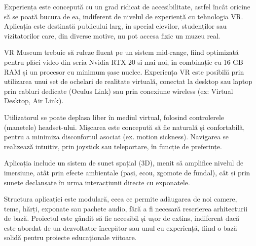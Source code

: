 Experiența este concepută cu un grad ridicat de accesibilitate, astfel încât oricine să se poată bucura de ea, indiferent de nivelul de experiență cu tehnologia VR. Aplicația este destinată publicului larg, în special elevilor, studenților sau vizitatorilor care, din diverse motive, nu pot accesa fizic un muzeu real.

VR Museum trebuie să ruleze fluent pe un sistem mid-range, fiind optimizată pentru plăci video din seria Nvidia RTX 20 si mai noi, în combinație cu 16 GB RAM și un procesor cu minimum șase nuclee. Experiența VR este posibilă prin utilizarea unui set de ochelari de realitate virtuală, conectat la desktop sau laptop prin cabluri dedicate (Oculus Link) sau prin conexiune wireless (ex: Virtual Desktop, Air Link).

Utilizatorul se poate deplasa liber în mediul virtual, folosind controlerele (manetele) headset-ului. Mișcarea este concepută să fie naturală și confortabilă, pentru a minimiza disconfortul asociat (ex. motion sickness). Navigarea se realizează intuitiv, prin joystick sau teleportare, în funcție de preferințe.

Aplicația include un sistem de sunet spațial (3D), menit să amplifice nivelul de imersiune, atât prin efecte ambientale (pași, ecou, zgomote de fundal), cât și prin sunete declanșate în urma interacțiunii directe cu exponatele.

Structura aplicației este modulară, ceea ce permite adăugarea de noi camere, teme, hărți, exponate sau pachete audio, fără a fi necesară rescrierea arhitecturii de bază. Proiectul este gândit să fie accesibil și ușor de extins, indiferent dacă este abordat de un dezvoltator începător sau unul cu experiență, fiind o bază solidă pentru proiecte educaționale viitoare.